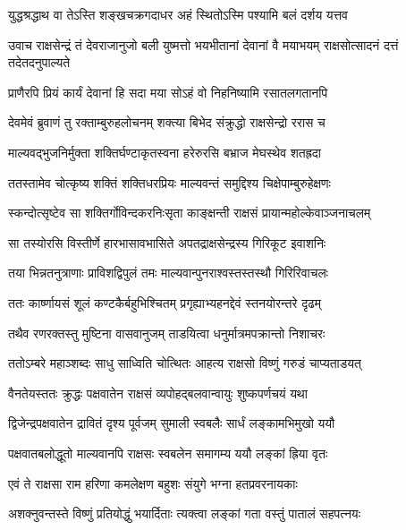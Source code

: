 \twolineshloka
{युद्धश्रद्धाथ वा तेऽस्ति शङ्खचक्रगदाधर}
{अहं स्थितोऽस्मि पश्यामि बलं दर्शय यत्तव} %

\threelineshloka
{उवाच राक्षसेन्द्रं तं देवराजानुजो बली}
{युष्मत्तो भयभीतानां देवानां वै मयाभयम्}
{राक्षसोत्सादनं दत्तं तदेतदनुपाल्यते} %

\twolineshloka
{प्राणैरपि प्रियं कार्यं देवानां हि सदा मया}
{सोऽहं वो निहनिष्यामि रसातलगतानपि} %

\twolineshloka
{देवमेवं ब्रुवाणं तु रक्ताम्बुरुहलोचनम्}
{शक्त्या बिभेद संक्रुद्धो राक्षसेन्द्रो ररास च} %

\twolineshloka
{माल्यवद्भुजनिर्मुक्ता शक्तिर्घण्टाकृतस्वना}
{हरेरुरसि बभ्राज मेघस्थेव शतह्रदा} %

\twolineshloka
{ततस्तामेव चोत्कृष्य शक्तिं शक्तिधरप्रियः}
{माल्यवन्तं समुद्दिश्य चिक्षेपाम्बुरुहेक्षणः} %

\twolineshloka
{स्कन्दोत्सृष्टेव सा शक्तिर्गोविन्दकरनिःसृता}
{काङ्क्षन्ती राक्षसं प्रायान्महोल्केवाञ्जनाचलम्} %

\twolineshloka
{सा तस्योरसि विस्तीर्णे हारभासावभासिते}
{अपतद्राक्षसेन्द्रस्य गिरिकूट इवाशनिः} %

\twolineshloka
{तया भिन्नतनुत्राणाः प्राविशद्विपुलं तमः}
{माल्यवान्पुनराश्वस्तस्तस्थौ गिरिरिवाचलः} %

\twolineshloka
{ततः कार्ष्णायसं शूलं कण्टकैर्बहुभिश्चितम्}
{प्रगृह्याभ्यहनद्देवं स्तनयोरन्तरे दृढम्} %

\twolineshloka
{तथैव रणरक्तस्तु मुष्टिना वासवानुजम्}
{ताडयित्वा धनुर्मात्रमपक्रान्तो निशाचरः} %

\twolineshloka
{ततोऽम्बरे महाञ्शब्दः साधु साध्विति चोत्थितः}
{आहत्य राक्षसो विष्णुं गरुडं चाप्यताडयत्} %

\twolineshloka
{वैनतेयस्ततः क्रुद्धः पक्षवातेन राक्षसं}
{व्यपोहद्बलवान्वायुः शुष्कपर्णचयं यथा} %

\twolineshloka
{द्विजेन्द्रपक्षवातेन द्रावितं दृश्य पूर्वजम्}
{सुमाली स्वबलैः सार्धं लङ्कामभिमुखो ययौ} %

\twolineshloka
{पक्षवातबलोद्धूतो माल्यवानपि राक्षसः}
{स्वबलेन समागम्य ययौ लङ्कां ह्रिया वृतः} %

\twolineshloka
{एवं ते राक्षसा राम हरिणा कमलेक्षण}
{बहुशः संयुगे भग्ना हतप्रवरनायकाः} %

\twolineshloka
{अशक्नुवन्तस्ते विष्णुं प्रतियोद्धुं भयार्दिताः}
{त्यक्त्वा लङ्कां गता वस्तुं पातालं सहपत्नयः} %

